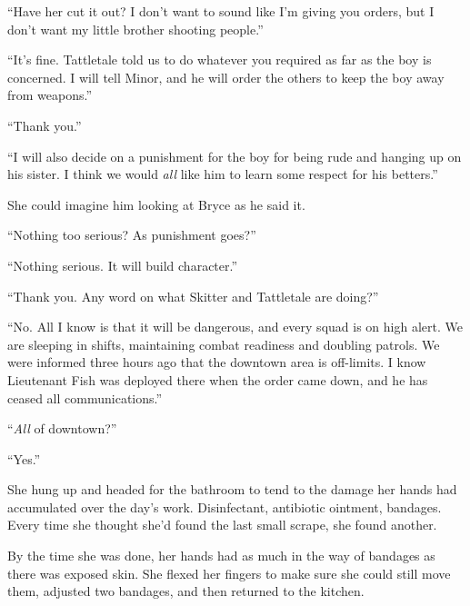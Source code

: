 ``Have her cut it out?  I don't want to sound like I'm giving you orders, but I don't want my little brother shooting people.''



``It's fine.  Tattletale told us to do whatever you required as far as the boy is concerned.  I will tell Minor, and he will order the others to keep the boy away from weapons.''



``Thank you.''



``I will also decide on a punishment for the boy for being rude and hanging up on his sister.  I think we would \emph{all} like him to learn some respect for his betters.''



She could imagine him looking at Bryce as he said it.



``Nothing too serious?  As punishment goes?''



``Nothing serious.  It will build character.''



``Thank you.  Any word on what Skitter and Tattletale are doing?''



``No.  All I know is that it will be dangerous, and every squad is on high alert.  We are sleeping in shifts, maintaining combat readiness and doubling patrols.  We were informed three hours ago that the downtown area is off-limits.  I know Lieutenant Fish was deployed there when the order came down, and he has ceased all communications.''



``\emph{All} of downtown?''



``Yes.''



She hung up and headed for the bathroom to tend to the damage her hands had accumulated over the day's work.  Disinfectant, antibiotic ointment, bandages.  Every time she thought she'd found the last small scrape, she found another.



By the time she was done, her hands had as much in the way of bandages as there was exposed skin.  She flexed her fingers to make sure she could still move them, adjusted two bandages, and then returned to the kitchen.



